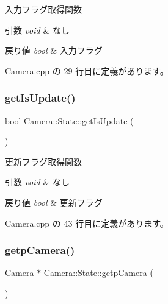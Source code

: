 入力フラグ取得関数 


\begin{DoxyParams}{引数}
{\em void} & なし \\
\hline
\end{DoxyParams}

\begin{DoxyRetVals}{戻り値}
{\em bool} & 入力フラグ \\
\hline
\end{DoxyRetVals}


 Camera.\+cpp の 29 行目に定義があります。

\mbox{\label{class_camera_1_1_state_a03b8930b430e095cce5f63853f845494}} 
\subsubsection{\texorpdfstring{get\+Is\+Update()}{getIsUpdate()}}
{\footnotesize\ttfamily bool Camera\+::\+State\+::get\+Is\+Update (\begin{DoxyParamCaption}{ }\end{DoxyParamCaption})}



更新フラグ取得関数 


\begin{DoxyParams}{引数}
{\em void} & なし \\
\hline
\end{DoxyParams}

\begin{DoxyRetVals}{戻り値}
{\em bool} & 更新フラグ \\
\hline
\end{DoxyRetVals}


 Camera.\+cpp の 43 行目に定義があります。

\mbox{\label{class_camera_1_1_state_a427018e0f1139ec2c189a8369eace5c3}} 
\subsubsection{\texorpdfstring{getp\+Camera()}{getpCamera()}}
{\footnotesize\ttfamily \mbox{\hyperlink{class_camera}{Camera}} $\ast$ Camera\+::\+State\+::getp\+Camera (\begin{DoxyParamCaption}{ }\end{DoxyParamCaption})}



